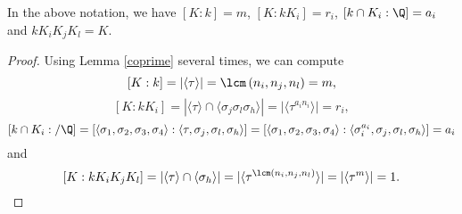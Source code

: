 \begin{theorem}
In the above notation, we have $[K:k]=m$, $[K:kK_i]=r_i$, $[k\cap K_i:\Q]=a_i$ and $kK_iK_jK_l=K$.%
\end{theorem}
\begin{proof}
Using Lemma \ref{coprime} several times, we can compute
$$[K:k]=|\langle\tau\rangle|=\lcm\left(n_i,n_j,n_l\right)=m,$$
$$[K:kK_i]=|\langle\tau\rangle\cap \langle\sigma_j\sigma_l\sigma_h\rangle|=|\langle\tau^{a_in_i}\rangle|=r_i,$$
$$[k\cap K_i:/\Q]=[\langle\sigma_1,\sigma_2,\sigma_3,\sigma_4\rangle:\langle\tau,\sigma_j,\sigma_l,\sigma_h\rangle]=[\langle\sigma_1,\sigma_2,\sigma_3,\sigma_4\rangle:\langle\sigma_i^{a_i},\sigma_j,\sigma_l,\sigma_h\rangle]=a_i$$
and
$$[K:kK_iK_jK_l]=|\langle\tau\rangle\cap \langle\sigma_h\rangle|=|\langle\tau^{\lcm\left(n_i,n_j,n_l\right)}\rangle|=|\langle\tau^m\rangle|=1.$$
\end{proof}
